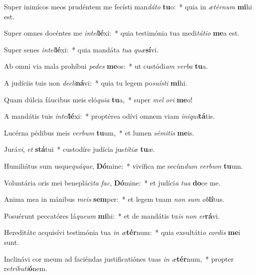 \item Super inimícos meos prudéntem me fecísti man\textit{dá}\textit{to} \textbf{tu}o:~* quia in \textit{æ}\textit{tér}\textit{num} \textbf{mi}hi est.
\item Super omnes docéntes me \textit{in}\textit{tel}\textbf{lé}xi:~* quia testimónia tua medi\textit{tá}\textit{ti}\textit{o} \textbf{me}a est.
\item Super senes \textit{in}\textit{tel}\textbf{lé}xi:~* quia mandáta \textit{tu}\textit{a} \textit{quæ}\textbf{sí}vi.
\item Ab omni via mala prohíbui \textit{pe}\textit{des} \textbf{me}os:~* ut custódi\textit{am} \textit{ver}\textit{ba} \textbf{tu}a.
\item A judíciis tuis non \textit{de}\textit{cli}\textbf{ná}vi:~* quia tu legem po\textit{su}\textit{ís}\textit{ti} \textbf{mi}hi.
\item Quam dúlcia fáucibus meis eló\textit{qui}\textit{a} \textbf{tu}a,~* super \textit{mel} \textit{o}\textit{ri} \textbf{me}o!
\item A mandátis tuis \textit{in}\textit{tel}\textbf{lé}xi:~* proptérea odívi omnem viam \textit{in}\textit{i}\textit{qui}\textbf{tá}tis.
\item Lucérna pédibus meis \textit{ver}\textit{bum} \textbf{tu}um,~* et lumen \textit{sé}\textit{mi}\textit{tis} \textbf{me}is.
\item Jurá\textit{vi}, \textit{et} \textbf{stá}tui~* custodíre judícia jus\textit{tí}\textit{ti}\textit{æ} \textbf{tu}æ.
\item Humiliátus sum usque\textit{quá}\textit{que}, \textbf{Dó}mine:~* vivífica me secún\textit{dum} \textit{ver}\textit{bum} \textbf{tu}um.
\item Voluntária oris mei benepláci\textit{ta} \textit{fac}, \textbf{Dó}mine:~* et judíci\textit{a} \textit{tu}\textit{a} \textbf{do}ce me.
\item Anima mea in mánibus \textit{me}\textit{is} \textbf{sem}per:~* et legem tuam \textit{non} \textit{sum} \textit{ob}\textbf{lí}tus.
\item Posuérunt peccatóres lá\textit{que}\textit{um} \textbf{mi}hi:~* et de mandátis tu\textit{is} \textit{non} \textit{er}\textbf{rá}vi.
\item Hereditáte acquisívi testimónia tua \textit{in} \textit{æ}\textbf{tér}num:~* quia exsultáti\textit{o} \textit{cor}\textit{dis} \textbf{me}i sunt.
\item Inclinávi cor meum ad faciéndas justificatiónes tuas \textit{in} \textit{æ}\textbf{tér}num,~* propter re\textit{tri}\textit{bu}\textit{ti}\textbf{ó}nem.

